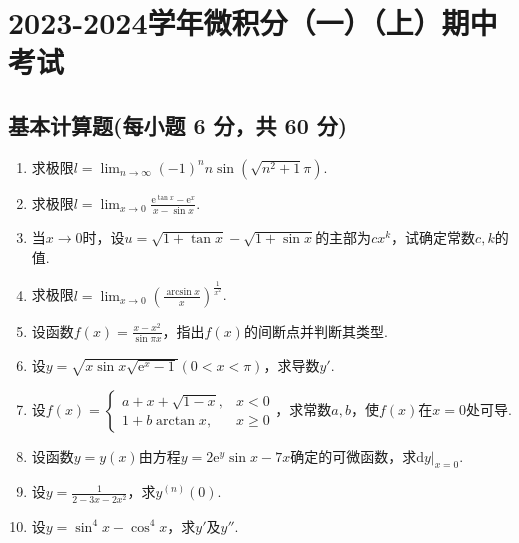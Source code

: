 \documentclass[../main.tex]{subfiles}
\begin{document}
\chapter{2023-2024学年微积分（一）（上）期中考试}

\section{基本计算题(每小题 6 分，共 60 分)}
\begin{enumerate}
    \item 求极限$l=\lim_{n\to\infty}(-1)^{n}n\sin\left(\sqrt{n^{2}+1}\pi\right)$.
          \vspace{11em}

    \item 求极限$l=\lim_{x\to0}\frac{\mathrm{e}^{\tan x}-\mathrm{e}^{x}}{x-\sin
                  x}.$
          \vspace{11em}

    \item 当$x\to 0$时，设$u=\sqrt{1+\tan x}-\sqrt{1+\sin x}$的主部为$cx^{k}$，试确定常数$c
              ,k$的值.
          \vspace{11em}

    \item 求极限$l=\lim_{x\to0}\left(\frac{\arcsin x}{x}\right)^{\frac{1}{x^{2}}}$.
          \vspace{11em}

    \item 设函数$f(x)=\frac{x-x^{2}}{\sin \pi x}$，指出$f(x)$的间断点并判断其类型.
          \vspace{9em}

    \item 设$y=\sqrt{x\sin x\sqrt{\mathrm{e}^{x}-1}}(0<x<\pi)$，求导数$y'$.
          \vspace{10em}

    \item 设$f(x)=
              \begin{cases}
                  a+x+\sqrt{1-x}, & x<0    \\
                  1+b\arctan x,   & x\geq0
              \end{cases}$，求常数$a,b$，使$f(x)$在$x=0$处可导.
          \vspace{10em}

    \item 设函数$y=y(x)$由方程$y=2\mathrm{e}^{y}\sin x-7x$确定的可微函数，求$\left
              .\mathrm{d}y\right|_{x=0}$.
          \vspace{10em}

    \item 设$y=\frac{1}{2-3x-2x^{2}}$，求$y^{(n)}(0)$.
          \vspace{8em}

    \item 设$y=\sin^{4} x-\cos^{4} x$，求$y'$及$y''$.
          \vspace{8em}
\end{enumerate}
\end{document}
